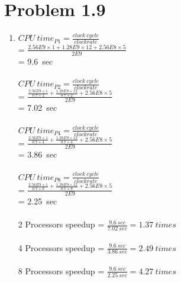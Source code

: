 \documentclass[]{article}
\begin{document}
\section*{Problem 1.9}
\begin{enumerate}[(1)]
\item $CPU\ time_{P1} = \frac{clock\ cycle}{clock rate}$\\
\hspace*{14.2ex}= $\frac{2.56E9\times 1+1.28E9\times 12+2.56E8\times 5}{2E9}$\\
\hspace*{14.2ex}= 9.6\ sec\\\\
$CPU\ time_{P2} = \frac{clock\ cycle}{clock rate}$\\
\hspace*{14.2ex}= $\frac{\frac{2.56E9\times 1}{0.7\times 2}+\frac{1.28E9\times 12}{0.7\times 2}+2.56E8\times 5}{2E9}$\\
\hspace*{14.2ex}= 7.02\ sec\\\\
$CPU\ time_{P4} = \frac{clock\ cycle}{clock rate}$\\
\hspace*{14.2ex}= $\frac{\frac{2.56E9\times 1}{0.7\times 4}+\frac{1.28E9\times 12}{0.7\times 4}+2.56E8\times 5}{2E9}$\\
\hspace*{14.2ex}= 3.86\ sec\\\\
$CPU\ time_{P8} = \frac{clock\ cycle}{clock rate}$\\
\hspace*{14.2ex}= $\frac{\frac{2.56E9\times 1}{0.7\times 8}+\frac{1.28E9\times 12}{0.7\times 8}+2.56E8\times 5}{2E9}$\\
\hspace*{14.2ex}= 2.25\ sec\\\\
2 Processors speedup = $\frac{9.6\ sec}{7.02 \ sec} = 1.37\ times$\\
\\
4 Processors speedup = $\frac{9.6\ sec}{3.86 \ sec} = 2.49\ times$\\
\\
8 Processors speedup = $\frac{9.6\ sec}{2.25 \ sec} = 4.27\ times$\\


\end{enumerate}
\end{document}

